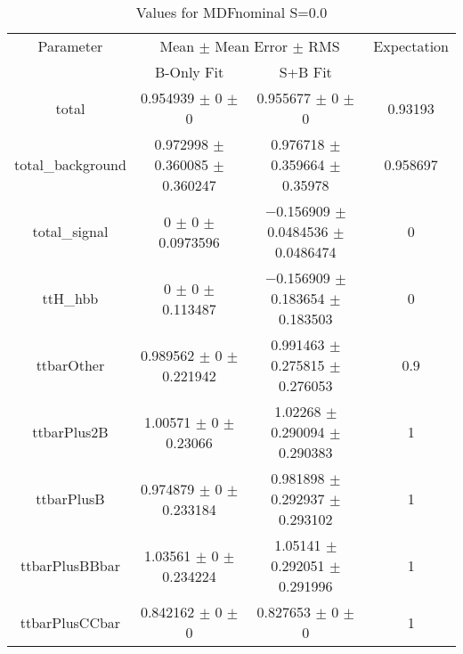 \begin{table}
\centering
\caption{Values for MDFnominal S=0.0}
\begin{tabular}{cccc}
\toprule
Parameter & \multicolumn{2}{c}{Mean $\pm$ Mean Error $\pm$ RMS} & Expectation\\
 & B-Only Fit & S+B Fit & \\
\midrule
total & \num{0.954939} $\pm$ \num{0} $\pm$ \num{0} & \num{0.955677} $\pm$ \num{0} $\pm$ \num{0} & \num{0.93193}\\
total\_background & \num{0.972998} $\pm$ \num{0.360085} $\pm$ \num{0.360247} & \num{0.976718} $\pm$ \num{0.359664} $\pm$ \num{0.35978} & \num{0.958697}\\
total\_signal & \num{0} $\pm$ \num{0} $\pm$ \num{0.0973596} & \num{-0.156909} $\pm$ \num{0.0484536} $\pm$ \num{0.0486474} & \num{0}\\
ttH\_hbb & \num{0} $\pm$ \num{0} $\pm$ \num{0.113487} & \num{-0.156909} $\pm$ \num{0.183654} $\pm$ \num{0.183503} & \num{0}\\
ttbarOther & \num{0.989562} $\pm$ \num{0} $\pm$ \num{0.221942} & \num{0.991463} $\pm$ \num{0.275815} $\pm$ \num{0.276053} & \num{0.9}\\
ttbarPlus2B & \num{1.00571} $\pm$ \num{0} $\pm$ \num{0.23066} & \num{1.02268} $\pm$ \num{0.290094} $\pm$ \num{0.290383} & \num{1}\\
ttbarPlusB & \num{0.974879} $\pm$ \num{0} $\pm$ \num{0.233184} & \num{0.981898} $\pm$ \num{0.292937} $\pm$ \num{0.293102} & \num{1}\\
ttbarPlusBBbar & \num{1.03561} $\pm$ \num{0} $\pm$ \num{0.234224} & \num{1.05141} $\pm$ \num{0.292051} $\pm$ \num{0.291996} & \num{1}\\
ttbarPlusCCbar & \num{0.842162} $\pm$ \num{0} $\pm$ \num{0} & \num{0.827653} $\pm$ \num{0} $\pm$ \num{0} & \num{1}\\
\bottomrule
\end{tabular}
\end{table}